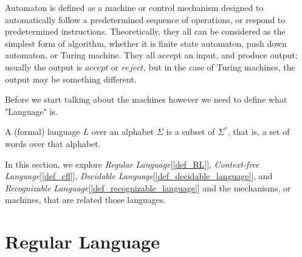 \documentclass{report}
\begin{document}
	Automaton is defined as a machine or control mechanism designed to automatically follow a predetermined sequence of operations, or respond to predetermined instructions. Theoretically, they all can be considered as the simplest form of algorithm, whether it is finite state automaton, push down automaton, or Turing machine. They all accept an input, and produce output; usually the output is $accept$ or $reject$, but in the case of Turing machines, the output may be something different.
	
	Before we start talking about the machines however we need to define what "Language" is.
	\begin{defn}[Language] \label{def_language}
		A (formal) language $L$ over an alphabet $\Sigma$ is a subset of $\Sigma^*$, that is, a set of words over that alphabet.
	\end{defn}
	
	In this section, we explore \emph{Regular Language}[\ref{def_RL}], \emph{Context-free Language}[\ref{def_cfl}], \emph{Decidable Language}[\ref{def_decidable_language}], and \emph{Recognizable Language}[\ref{def_recognizable_language}] and the mechanisms, or machines, that are related those languages.
	
	\section{Regular Language}
\end{document}
